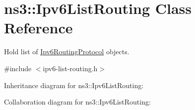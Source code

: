 \hypertarget{classns3_1_1Ipv6ListRouting}{}\section{ns3\+:\+:Ipv6\+List\+Routing Class Reference}
\label{classns3_1_1Ipv6ListRouting}


Hold list of \hyperlink{classns3_1_1Ipv6RoutingProtocol}{Ipv6\+Routing\+Protocol} objects.  




{\ttfamily \#include $<$ipv6-\/list-\/routing.\+h$>$}



Inheritance diagram for ns3\+:\+:Ipv6\+List\+Routing\+:


Collaboration diagram for ns3\+:\+:Ipv6\+List\+Routing\+:
